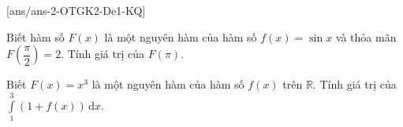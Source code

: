 [ans/ans-2-OTGK2-De1-KQ]
\caukq
\begin{ex}%
	Biết hàm số $ F(x)$ là một nguyên hàm của hàm số $ f(x)=\sin x$ và thỏa mãn $F\left(\dfrac{\pi}{2}\right)=2$. Tính giá trị của $F(\pi)$.
\end{ex}
\begin{ex}%
	Biết $F(x)=x^{3}$ là một nguyên hàm của hàm số $f(x)$ trên $\mathbb{R}$. Tính giá trị của $\displaystyle\int\limits_{1}^{3}(1+f(x))\mathrm{\,d}x$.
\end{ex}
